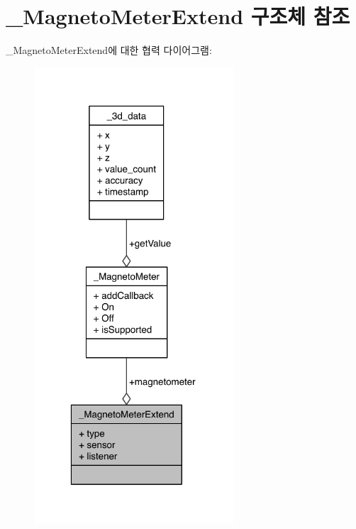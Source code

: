 \hypertarget{struct___magneto_meter_extend}{\section{\-\_\-\-Magneto\-Meter\-Extend 구조체 참조}
\label{struct___magneto_meter_extend}
}


\-\_\-\-Magneto\-Meter\-Extend에 대한 협력 다이어그램\-:\nopagebreak
\begin{figure}[H]
\begin{center}
\leavevmode
\includegraphics[width=211pt]{d1/d28/struct___magneto_meter_extend__coll__graph}
\end{center}
\end{figure}
